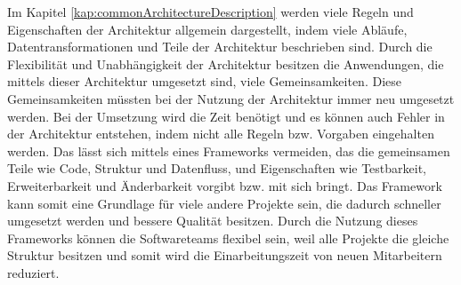 Im Kapitel \ref{kap:commonArchitectureDescription} werden viele Regeln und Eigenschaften der Architektur allgemein dargestellt, 
indem viele Abläufe, Datentransformationen und Teile der Architektur beschrieben sind.
Durch die Flexibilität und Unabhängigkeit der Architektur besitzen die Anwendungen, die mittels dieser Architektur umgesetzt sind, viele Gemeinsamkeiten.
Diese Gemeinsamkeiten müssten bei der Nutzung der Architektur immer neu umgesetzt werden.
Bei der Umsetzung wird die Zeit benötigt und es können auch Fehler in der Architektur entstehen, indem nicht alle Regeln bzw. Vorgaben eingehalten werden.
Das lässt sich mittels eines Frameworks vermeiden, das die gemeinsamen Teile wie Code, Struktur und Datenfluss,  
und Eigenschaften wie Testbarkeit, Erweiterbarkeit und Änderbarkeit vorgibt bzw. mit sich bringt.
Das Framework kann somit eine Grundlage für viele andere Projekte sein, 
die dadurch schneller umgesetzt werden und bessere Qualität besitzen.
Durch die Nutzung dieses Frameworks können die Softwareteams flexibel sein,
weil alle Projekte die gleiche Struktur besitzen und somit wird die Einarbeitungszeit von neuen Mitarbeitern reduziert.